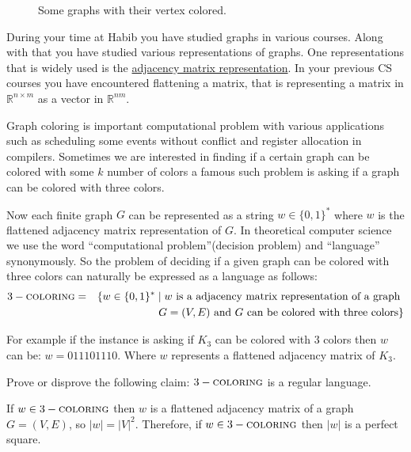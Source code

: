 \documentclass[a4paper]{exam}
\newcommand{\prob}{3-\textsc{coloring}} %
\begin{document}
\begin{figure}[h]
\begin{center}
	\end{center}
	\caption{Some graphs with their vertex colored.}
	\label{fig: Colored}
\end{figure}




\begin{questions}
	\question During your time at Habib you have studied graphs in various courses. Along with that you have studied various representations of graphs. One representations that is widely used is the \href{https://en.wikipedia.org/wiki/Adjacency_matrix}{adjacency matrix representation}.
	In your previous CS courses you have encountered flattening a matrix, that is representing a matrix in $\mathbb{R}^{n\times m}$ as a vector in $\mathbb{R}^{n m}$.

	Graph coloring is important computational problem with various applications such as scheduling some events without conflict and register allocation in compilers. Sometimes we are interested in finding if a certain graph can be colored with some $k$ number of colors a famous such problem is asking if a graph can be colored with three colors.

	Now each finite graph $G$ can be represented as a string $w \in \{0,1\}^*$ where $w$ is the flattened adjacency matrix representation of $G$.
	In theoretical computer science we use the word ``computational problem''(decision problem) and ``language'' synonymously. So the problem of deciding if a given graph can be colored with three colors can naturally be expressed as a language as follows:
	\begin{eqnarray*}
		\prob &=& \{w \in \{0,1\}^*\mid w \text{ is a adjacency matrix representation of a graph } \\ && G = (V,E) \text{ and } G \text{ can be colored with three colors}\}
	\end{eqnarray*}

	For example if the instance is asking if $K_3$ can be colored with $3$ colors then $w$ can be: $w = 011 101 110$. Where $w$ represents a flattened adjacency matrix of $K_3$.

	Prove or disprove the following claim: $\prob$ is a regular language.

	\begin{solution}
		If $w \in \prob$ then $w$ is a flattened adjacency matrix of a graph $G = (V,E)$, so $|w| = |V|^2$. Therefore, if $w \in \prob$ then $|w|$ is a perfect square. \\


\end{solution}
\end{questions}
\end{document}
